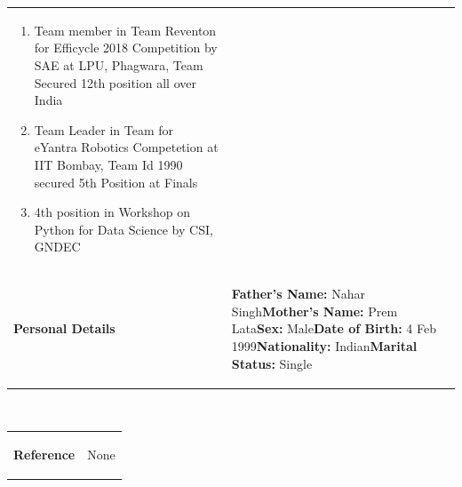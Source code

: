 \documentclass[10pt,doublespace]{article}
\begin{document}
\begin{tabular}{p{3cm}  p{10cm} }
\begin{enumerate}
\item Team member in Team Reventon for Efficycle 2018 Competition by SAE at LPU, Phagwara, Team Secured 12th position all over India 
\item Team Leader in Team for eYantra Robotics Competetion at IIT Bombay, Team Id 1990 secured 5th Position at Finals
\item 4th position in Workshop on Python for Data Science by CSI, GNDEC
\end{enumerate}\\
\begin{flushleft} \textbf{Personal Details}\end{flushleft}&
\begin{flushleft} \textbf{Father’s Name:} Nahar Singh\newline \textbf{Mother’s Name:} Prem Lata\newline \textbf{Sex:} Male\newline \textbf{Date of Birth:} 4 Feb 1999\newline \textbf{Nationality:} Indian\newline \textbf{Marital Status:} Single
\end{flushleft}\\
\end{tabular}\\
\begin{tabular}{p{3cm}  p{10cm} }
\begin{flushleft} \textbf{Reference}\end{flushleft}&
\begin{flushleft} None
\end{flushleft}\\
 \end{tabular}
\end{document}
